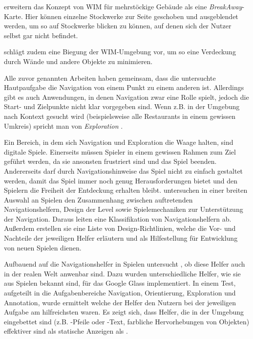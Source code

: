 \textcite{Chittaro2005} erweitern das Konzept von WIM für mehrstöckige Gebäude als eine \emph{BreakAway}-Karte.
Hier können einzelne Stockwerke zur Seite geschoben und ausgeblendet werden, um so auf Stockwerke blicken zu können, auf denen sich der Nutzer selbst gar nicht befindet.

\textcite{Vallance2001} schlägt zudem eine Biegung der WIM-Umgebung vor, um so eine Verdeckung durch Wände und andere Objekte zu minimieren.

Alle zuvor genannten Arbeiten haben gemeinsam, dass die untersuchte Hautpaufgabe die Navigation von einem Punkt zu einem anderen ist.
Allerdings gibt es auch Anwendungen, in denen Navigation zwar eine Rolle spielt, jedoch die Start- und Zielpunkte nicht klar vorgegeben sind.
Wenn z.B. in der Umgebung nach Kontext gesucht wird (beispielsweise alle Restaurants in einem gewissen Umkreis) spricht man von \emph{Exploration} \parencite[28]{Lodts2015}.

Ein Bereich, in dem sich Navigation und Exploration die Waage halten, sind digitale Spiele.
Einerseits müssen Spieler in einem gewissen Rahmen zum Ziel geführt werden, da sie ansonsten frustriert sind und das Spiel beenden.
Andererseits darf durch Navigationshinweise das Spiel nicht zu einfach gestaltet werden, damit das Spiel immer noch genug Herausforderungen bietet und den Spielern die Freiheit der Entdeckung erhalten bleibt.
\textcites{Moura2014}{Moura2015} untersuchen in einer breiten Auswahl an Spielen den Zusammenhang zwischen auftretenden Navigationshelfern, Design der Level sowie Spielemechaniken zur Unterstützung der Navigation.
Daraus leiten \textcite{Moura2015} eine Klassifikation von Navigationshelfern ab.
Außerdem erstellen sie eine Liste von Design-Richtlinien, welche die Vor- und Nachteile der jeweiligen Helfer erläutern und als Hilfestellung für Entwicklung von neuen Spielen dienen.

Aufbauend auf die Navigationshelfer in Spielen untersucht \textcite{Lodts2015}, ob diese Helfer auch in der realen Welt anwenbar sind.
Dazu wurden unterschiedliche Helfer, wie sie aus Spielen bekannt sind, für das Google Glass implementiert.
In einem Test, aufgeteilt in die Aufgabenbereiche Navigation, Orientierung, Exploration und Annotation, wurde ermittelt welche der Helfer den Nutzern bei der jeweiligen Aufgabe am hilfreichsten waren.
Es zeigt sich, dass Helfer, die in der Umgebung eingebettet sind (z.B. -Pfeile oder -Text, farbliche Hervorhebungen von Objekten) effektiver sind als statische Anzeigen als .

